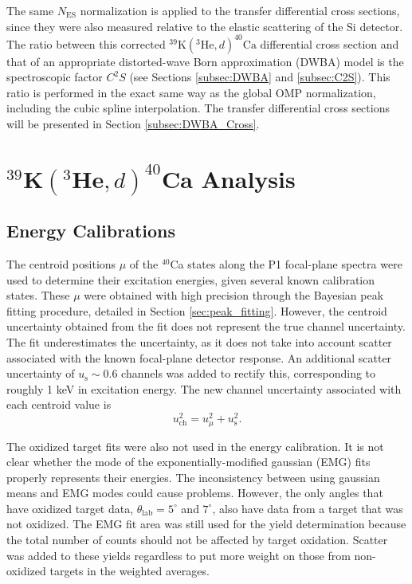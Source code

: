 The same $N_{\mathrm{ES}}$ normalization is applied to the transfer differential cross sections, since they were also measured relative to the elastic scattering of the Si detector. The ratio between this corrected $^{39}\mathrm{K}(^{3}\mathrm{He}, d)^{40}\mathrm{Ca}$ differential cross section and that of an appropriate distorted-wave Born approximation (DWBA) model is the spectroscopic factor $C^{2}S$ (see Sections \ref{subsec:DWBA} and \ref{subsec:C2S}). This ratio is performed in the exact same way as the global OMP normalization, including the cubic spline interpolation. The transfer differential cross sections will be presented in Section \ref{subsec:DWBA_Cross}.

\section{$^{39}\mathrm{\textbf{K}}(^{3}\mathrm{\textbf{He}},d)^{40}\mathrm{\textbf{Ca}}$ Analysis}

\subsection{Energy Calibrations} \label{subsec:cal}

The centroid positions $\mu$ of the $^{40}$Ca states along the P1 focal-plane spectra were used to determine their excitation energies, given several known calibration states. These $\mu$ were obtained with high precision through the Bayesian peak fitting procedure, detailed in Section \ref{sec:peak_fitting}. However, the centroid uncertainty obtained from the fit does not represent the true channel uncertainty. The fit underestimates the uncertainty, as it does not take into account scatter associated with the known focal-plane detector response. An additional scatter uncertainty of $u_{\mathrm{s}} \sim 0.6$ channels was added to rectify this, corresponding to roughly 1 keV in excitation energy. The new channel uncertainty associated with each centroid value is
\begin{equation}
u_{\mathrm{ch}}^{2} = u_{\mu}^{2} + u_{\mathrm{s}}^{2}.
\end{equation}

The oxidized target fits were also not used in the energy calibration. It is not clear whether the mode of the exponentially-modified gaussian (EMG) fits properly represents their energies. The inconsistency between using gaussian means and EMG modes could cause problems. However, the only angles that have oxidized target data, $\theta_{\mathrm{lab}} = 5^{\circ}$ and $7^{\circ}$, also have data from a target that was not oxidized. The EMG fit area was still used for the yield determination because the total number of counts should not be affected by target oxidation. Scatter was added to these yields regardless to put more weight on those from non-oxidized targets in the weighted averages.

